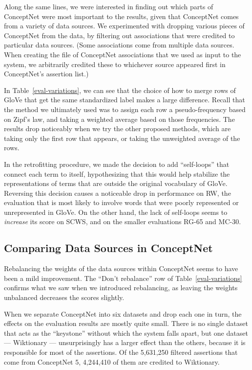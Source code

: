 \documentclass[letterpaper]{article}
\begin{document}
Along the same lines, we were interested in finding out which parts of
ConceptNet were most important to the results, given that ConceptNet comes from
a variety of data sources. We experimented with dropping various pieces of
ConceptNet from the data, by filtering out associations that were credited to
particular data sources. (Some associations come from multiple data sources.
When creating the file of ConceptNet associations that we used as input to the
system, we arbitrarily credited these to whichever source appeared first in
ConceptNet's assertion list.)

In Table~\ref{eval-variations}, we can see that the choice of how to merge
rows of GloVe that get the same standardized label makes a large difference.
Recall that the method we ultimately used was to assign each row a
pseudo-frequency based on Zipf's law, and taking a weighted average based on
those frequencies. The results drop noticeably when we try the other proposed
methods, which are taking only the first row that appears, or taking the
unweighted average of the rows.

In the retrofitting procedure, we made the decision to add ``self-loops'' that
connect each term to itself, hypothesizing that this would help stabilize the
representations of terms that are outside the original vocabulary of GloVe.
Reversing this decision causes a noticeable drop in performance on RW, the
evaluation that is most likely to involve words that were poorly represented or
unrepresented in GloVe. On the other hand, the lack of self-loops seems to {\em
increase} its score on SCWS, and on the smaller evaluations RG-65 and MC-30.

\subsection{Comparing Data Sources in ConceptNet}

Rebalancing the weights of the data sources within ConceptNet seems to have
been a mild improvement. The ``Don't rebalance'' row of Table~\ref{eval-variations}
confirms what we saw when we introduced rebalancing,
as leaving the weights unbalanced decreases the scores slightly.

When we separate ConceptNet into six datasets and drop each one in turn, the
effects on the evaluation results are mostly quite small. There is no single
dataset that acts as the ``keystone'' without which the system falls apart,
but one dataset --- Wiktionary --- unsurprisingly has a larger effect than the
others, because it is responsible for most of the assertions. Of the 5,631,250
filtered assertions that come from ConceptNet 5, 4,244,410 of them are credited
to Wiktionary.
\end{document}
